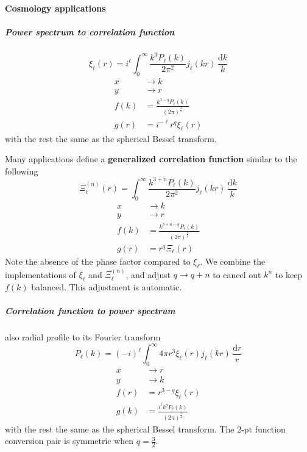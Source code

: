 \documentclass{article}
\renewcommand{\d}{\mathrm{d}}
\begin{document}
\paragraph{Cosmology applications}


\subparagraph{Power spectrum to correlation function}
\begin{equation}
    \xi_\ell(r) = i^\ell \int_0^\infty \frac{k^3P_\ell(k)}{2\pi^2} j_\ell(kr) \,\frac{\d k}k
\end{equation}
\begin{align}
    x &\to k \\
    y &\to r \\
    f(k) &= \frac{k^{3-q} P_\ell(k)}{(2\pi)^\frac32} \\
    g(r) &= i^{-\ell} r^q \xi_\ell(r)
\end{align}
with the rest the same as the spherical Bessel transform.

Many applications define a \textbf{generalized correlation function}
similar to the following
\begin{equation}
    \Xi_\ell^{(n)}(r) = \int_0^\infty \frac{k^{3+n}P_\ell(k)}{2\pi^2} j_\ell(kr) \,\frac{\d k}k
\end{equation}
\begin{align}
    x &\to k \\
    y &\to r \\
    f(k) &= \frac{k^{3+n-q} P_\ell(k)}{(2\pi)^\frac32} \\
    g(r) &= r^q \Xi_\ell(r)
\end{align}
Note the absence of the phase factor compared to $\xi_\ell$.
We combine the implementations of $\xi_\ell$ and $\Xi_\ell^{(n)}$,
and adjust $q \to q+n$ to cancel out $k^n$ to keep $f(k)$ balanced.
This adjustment is automatic.


\subparagraph{Correlation function to power spectrum}
also radial profile to its Fourier transform
\begin{equation}
    P_\ell(k) = (-i)^\ell \int_0^\infty 4\pi r^3\xi_\ell(r) j_\ell(kr) \,\frac{\d r}r
\end{equation}
\begin{align}
    x &\to r \\
    y &\to k \\
    f(r) &= r^{3-q} \xi_\ell(r) \\
    g(k) &= \frac{i^\ell k^q P_\ell(k)}{(2\pi)^\frac32}
\end{align}
with the rest the same as the spherical Bessel transform.
The 2-pt function conversion pair is symmetric when $q=\frac32$.
\end{document}
